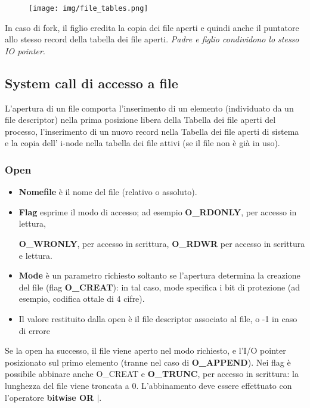 \documentclass{article}
\begin{document}
\begin{figure}[h!]
    \begin{center}
        \texttt{[image: img/file\_tables.png]}      
    \end{center}
\end{figure}

\noindent In caso di fork, il figlio eredita la copia dei file aperti
e quindi anche il puntatore allo stesso record della tabella 
dei file aperti. \textit{Padre e figlio condividono lo stesso 
IO pointer}.

\subsection{System call di accesso a file}
L'apertura di un file comporta l'inserimento di un elemento
(individuato da un file descriptor) nella
prima posizione libera della Tabella dei file aperti
 del processo,  l'inserimento di un nuovo record nella
 Tabella dei file aperti di sistema e la copia dell'
 i-node nella tabella dei  file attivi (se il file non è 
 già in uso).

\subsubsection{Open}
\noindent {} 
\medskip
\begin{itemize}
    \item \textbf{Nomefile} è il nome del file (relativo o assoluto).
    \item \textbf{Flag} esprime il modo di accesso; ad esempio
    \textbf{O\_RDONLY}, per accesso in lettura,
    
    \textbf{O\_WRONLY}, per accesso in scrittura,
    \textbf{O\_RDWR} per accesso in scrittura e lettura.
    \item \textbf{Mode} è un parametro richiesto soltanto se l'apertura determina la
    creazione del file (flag \textbf{O\_CREAT}): in tal caso, mode specifica i bit di
    protezione (ad esempio, codifica ottale di 4 cifre).
    \item Il valore restituito dalla open è il file
     descriptor associato al file, o -1 in caso di errore
\end{itemize}

\noindent Se la open ha successo, il file viene aperto nel modo richiesto, e
l'I/O pointer posizionato sul primo elemento (tranne nel caso
 di \textbf{O\_APPEND}). Nei flag è possibile abbinare anche O\_CREAT e 
 \textbf{O\_TRUNC}, per accesso in scrittura: la lunghezza del
 file viene troncata a 0. L'abbinamento deve essere effettuato
 con l'operatore \textbf{bitwise OR $|$}.
\end{document}
